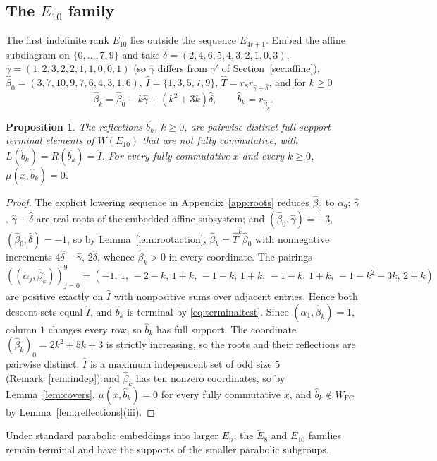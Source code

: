 \documentclass[10pt]{article}
\newtheorem{proposition}[theorem]{Proposition}
\theoremstyle{remark}
\newcommand{\FC}{W_{\mathrm{FC}}}
\begin{document}
\subsection{The \texorpdfstring{$E_{10}$}{E10} family}\label{sec:e10}
The first indefinite rank $E_{10}$ lies outside the sequence $E_{4r+1}$.
Embed the affine subdiagram on $\{0,\ldots,7,9\}$ and take
$\hat\delta=(2,4,6,5,4,3,2,1,0,3)$, $\hat\gamma=(1,2,3,2,2,1,1,0,0,1)$ (so
$\hat\gamma$ differs from $\gamma'$ of Section~\ref{sec:affine}),
$\hat\beta_0=(3,7,10,9,7,6,4,3,1,6)$, $\hat I=\{1,3,5,7,9\}$,
$\hat T=r_{\hat\gamma}r_{\hat\gamma+\hat\delta}$, and for $k\geq0$
\begin{equation}\label{eq:e10roots}
 \hat\beta_k=\hat\beta_0-k\hat\gamma+(k^2+3k)\hat\delta,\qquad
 \hat b_k=r_{\hat\beta_k}.
\end{equation}
\begin{proposition}\label{prop:e10}
The reflections $\hat b_k$, $k\geq0$, are pairwise distinct full-support
terminal elements of $W(E_{10})$ that are not fully commutative, with
$L(\hat b_k)=R(\hat b_k)=\hat I$. For every fully commutative $x$ and every
$k\geq0$, $\mu(x,\hat b_k)=0$.
\end{proposition}
\begin{proof}
The explicit lowering sequence in Appendix~\ref{app:roots}
reduces $\hat\beta_0$ to $\alpha_9$; $\hat\gamma$, $\hat\gamma+\hat\delta$
are real roots of the embedded affine subsystem; and
$(\hat\beta_0,\hat\gamma)=-3$, $(\hat\beta_0,\hat\delta)=-1$, so
by Lemma~\ref{lem:rootaction}, $\hat\beta_k=\hat T^k\hat\beta_0$ with
nonnegative increments $4\hat\delta-\hat\gamma$, $2\hat\delta$, whence
$\hat\beta_k>0$ in every coordinate. The pairings
\[
 ((\alpha_j,\hat\beta_k))_{j=0}^9
 =(-1,\,1,\,-2-k,\,1+k,\,-1-k,\,1+k,\,-1-k,\,1+k,\,-1-k^2-3k,\,2+k)
\]
are positive exactly on $\hat I$ with nonpositive sums over adjacent
entries. Hence both descent sets equal $\hat I$, and $\hat b_k$ is
terminal by \eqref{eq:terminaltest}. Since $(\alpha_1,\hat\beta_k)=1$,
column $1$ changes every row, so $\hat b_k$ has full support. The
coordinate $(\hat\beta_k)_0=2k^2+5k+3$ is strictly increasing, so the
roots and their reflections are pairwise distinct. $\hat I$ is a maximum
independent set of odd size $5$
(Remark~\ref{rem:indep}) and $\hat\beta_k$ has ten nonzero coordinates, so
by Lemma~\ref{lem:covers}, $\mu(x,\hat b_k)=0$ for every fully
commutative $x$, and $\hat b_k\notin\FC$ by Lemma~\ref{lem:reflections}(iii).
\end{proof}
Under standard parabolic embeddings into larger $E_n$, the
$\widetilde E_8$ and $E_{10}$ families remain terminal and have the
supports of the smaller parabolic subgroups.
\end{document}
